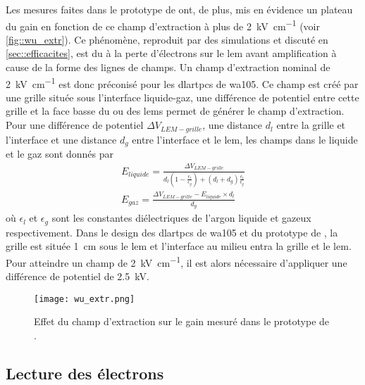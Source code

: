       Les mesures faites dans le prototype de \threeL{} ont, de plus, mis en évidence un plateau du gain en fonction de ce champ d'extraction à plus de \SI{2}{\kilo\volt\per\centi\meter} (voir \autoref{fig::wu_extr}). Ce phénomène, reproduit par des simulations et discuté en \autoref{sec::efficacites}, est du à la perte d'électrons sur le \gls{lem} avant amplification à cause de la forme des lignes de champs. Un champ d'extraction nominal de \SI{2}{\kilo\volt\per\centi\meter} est donc préconisé pour les \glspl{dlartpc} de \gls{wa105}. Ce champ est créé par une grille située sous l'interface liquide-gaz, une différence de potentiel entre cette grille et la face basse du ou des \glspl{lem} permet de générer le champ d'extraction. Pour une différence de potentiel $\Delta V_{LEM-grille}$, une distance $d_l$ entre la grille et l'interface et une distance $d_g$ entre l'interface et le \gls{lem}, les champs dans le liquide et le gaz sont donnés par
      \begin{eqnarray}\label{eq::fields_liquid_gas}
          E_{liquide} = \frac{\Delta V_{LEM-grille}}{d_l(1-\frac{\epsilon_l}{\epsilon_g}) + (d_l+d_g)\frac{\epsilon_l}{\epsilon_g}} \\ 
          E_{gaz} = \frac{\Delta V_{LEM-grille} - E_{liquide} \times d_l}{d_g}
        \end{eqnarray}
      où $\epsilon_l$ et $\epsilon_g$ sont les constantes diélectriques de l'argon liquide et gazeux respectivement. Dans le design des \glspl{dlartpc} de \gls{wa105} et du prototype de \threeL{}, la grille est située \SI{1}{\centi\meter} sous le \gls{lem} et l'interface au milieu entra la grille et le \gls{lem}. Pour atteindre un champ de \SI{2}{\kilo\volt\per\centi\meter}, il est alors nécessaire d'appliquer une différence de potentiel de \SI{2.5}{\kilo\volt}.

      \begin{figure}[!htb]
        \centering
        \texttt{[image: wu\_extr.png]}
        \caption[Effet du champ d'extraction sur le gain mesuré dans le prototype de \threeL{}]{\label{fig::wu_extr}Effet du champ d'extraction sur le gain mesuré dans le prototype de \threeL{}\cite{Wu2017}.}
      \end{figure}

    \subsection{Lecture des électrons}\label{sec::induction}
    
